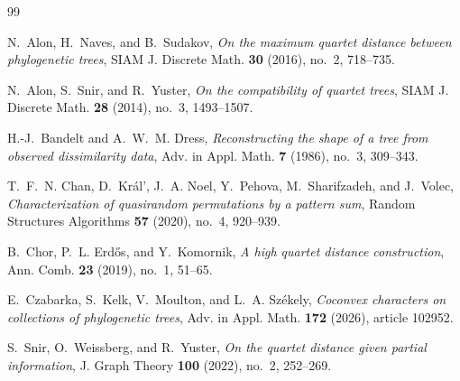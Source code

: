 \documentclass[a4paper]{amsart}
\theoremstyle{remark}
\begin{document}
\begin{thebibliography}{99}

N.~Alon, H.~Naves, and B.~Sudakov,
\emph{On the maximum quartet distance between phylogenetic trees},
SIAM J. Discrete Math. \textbf{30} (2016), no.~2, 718--735.

N.~Alon, S.~Snir, and R.~Yuster,
\emph{On the compatibility of quartet trees},
SIAM J. Discrete Math. \textbf{28} (2014), no.~3, 1493--1507.

H.-J.~Bandelt and A.~W.~M. Dress,
\emph{Reconstructing the shape of a tree from observed dissimilarity
data},
Adv. in Appl. Math. \textbf{7} (1986), no.~3, 309--343.

T.~F.~N. Chan, D.~Kr\'al', J.~A. Noel, Y.~Pehova,
M.~Sharifzadeh, and J.~Volec,
\emph{Characterization of quasirandom permutations by a pattern sum},
Random Structures Algorithms \textbf{57} (2020), no.~4, 920--939.

B.~Chor, P.~L. Erd\H{o}s, and Y.~Komornik,
\emph{A high quartet distance construction},
Ann. Comb. \textbf{23} (2019), no.~1, 51--65.

E.~Czabarka, S.~Kelk, V.~Moulton, and L.~A. Sz\'ekely,
\emph{Coconvex characters on collections of phylogenetic trees},
Adv. in Appl. Math. \textbf{172} (2026), article 102952.

S.~Snir, O.~Weissberg, and R.~Yuster,
\emph{On the quartet distance given partial information},
J. Graph Theory \textbf{100} (2022), no.~2, 252--269.

\end{thebibliography}
\end{document}

